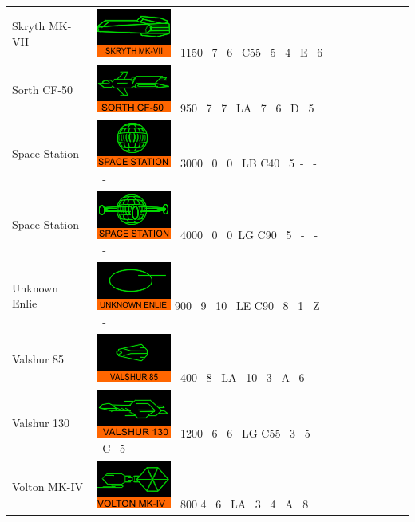 \begin{itemize}
\begin{tabular}{ | l | l | l | l | l | l | l | l | l | }
Skryth MK-VII & \includegraphics{images/ship_skryth_mk_vii.png} \ 1150 \ 7 \ 6 \ C55 \ 5 \ 4 \ E \ 6 \\
Sorth CF-50 & \includegraphics{images/ship_sorth_cf_50.png} \ 950 \ 7 \ 7 \ LA \ 7 \ 6 \ D \ 5 \\
Space Station & \includegraphics{images/ship_spacestation_1.png} \ 3000 \ 0 \ 0 \ LB C40 \ 5\ - \ - \ - \\
Space Station & \includegraphics{images/ship_spacestation_2.png} \ 4000 \ 0 \ 0\ LG C90 \ 5 \ - \ - \ - \\
Unknown Enlie & \includegraphics{images/ship_unknown_enlie.png} 900 \ 9 \ 10 \ LE C90 \ 8 \ 1 \ Z \ - \\
Valshur 85 & \includegraphics{images/ship_valshur_85.png} \ 400 \ 8 \ LA \ 10 \ 3 \ A \ 6 \\
Valshur 130 & \includegraphics{images/ship_valshur_130.png} \ 1200 \ 6 \ 6 \ LG C55 \ 3 \ 5 \ C \ 5 \\
Volton MK-IV & \includegraphics{images/ship_volton_mk_iv.png} \ 800 4 \ 6 \ LA \ 3 \ 4 \ A \ 8 \\

\end{tabular}
\end{itemize}
